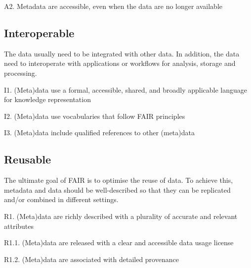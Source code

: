 \documentclass[
  english,
  paper=a4,
  oneside,captions=tableheading
]{scrbook}
\renewenvironment{quote}{\begin{customblockquote}\list{}{\rightmargin=0em\leftmargin=0em}%
\item\relax\color{blockquote-text}\ignorespaces}{\unskip\unskip\endlist\end{customblockquote}}
\begin{document}
\begin{quote}
A2. Metadata are accessible, even when the data are no longer available
\end{quote}

\hypertarget{interoperable}{%
\subsection{Interoperable}\label{interoperable}}

\begin{quote}
The data usually need to be integrated with other data. In addition, the
data need to interoperate with applications or workflows for analysis,
storage and processing.
\end{quote}

\begin{quote}
I1. (Meta)data use a formal, accessible, shared, and broadly applicable
language for knowledge representation
\end{quote}

\begin{quote}
I2. (Meta)data use vocabularies that follow FAIR principles
\end{quote}

\begin{quote}
I3. (Meta)data include qualified references to other (meta)data
\end{quote}

\hypertarget{reusable}{%
\subsection{Reusable}\label{reusable}}

\begin{quote}
The ultimate goal of FAIR is to optimise the reuse of data. To achieve
this, metadata and data should be well-described so that they can be
replicated and/or combined in different settings.
\end{quote}

\begin{quote}
R1. (Meta)data are richly described with a plurality of accurate and
relevant attributes
\end{quote}

\begin{quote}
R1.1. (Meta)data are released with a clear and accessible data usage
license
\end{quote}

\begin{quote}
R1.2. (Meta)data are associated with detailed provenance
\end{quote}
\end{document}
